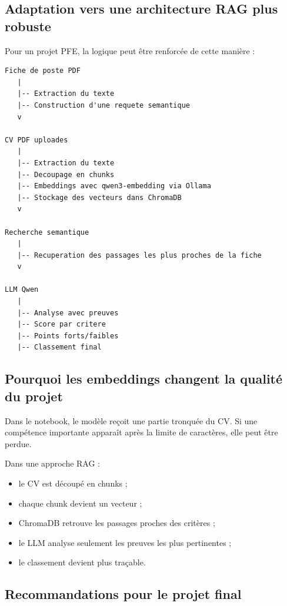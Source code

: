 \documentclass[12pt,a4paper]{article}
\begin{document}
\subsection{Adaptation vers une architecture RAG plus robuste}

Pour un projet PFE, la logique peut être renforcée de cette manière :

\begin{verbatim}
Fiche de poste PDF
   |
   |-- Extraction du texte
   |-- Construction d'une requete semantique
   v

CV PDF uploades
   |
   |-- Extraction du texte
   |-- Decoupage en chunks
   |-- Embeddings avec qwen3-embedding via Ollama
   |-- Stockage des vecteurs dans ChromaDB
   v

Recherche semantique
   |
   |-- Recuperation des passages les plus proches de la fiche
   v

LLM Qwen
   |
   |-- Analyse avec preuves
   |-- Score par critere
   |-- Points forts/faibles
   |-- Classement final
\end{verbatim}

\subsection{Pourquoi les embeddings changent la qualité du projet}

Dans le notebook, le modèle reçoit une partie tronquée du CV. Si une compétence importante apparaît après la limite de caractères, elle peut être perdue.

Dans une approche RAG :

\begin{itemize}
  \item le CV est découpé en chunks ;
  \item chaque chunk devient un vecteur ;
  \item ChromaDB retrouve les passages proches des critères ;
  \item le LLM analyse seulement les preuves les plus pertinentes ;
  \item le classement devient plus traçable.
\end{itemize}

\subsection{Recommandations pour le projet final}
\end{document}
